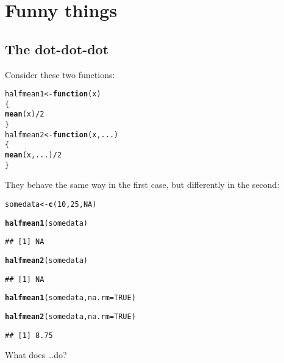 \documentclass[12pt,a4paper]{scrartcl}\usepackage[]{graphicx}\usepackage[]{color}
\makeatletter
\newcommand{\hlnum}[1]{\textcolor[rgb]{0.686,0.059,0.569}{#1}}%
\newcommand{\hlopt}[1]{\textcolor[rgb]{0,0,0}{#1}}%
\newcommand{\hlstd}[1]{\textcolor[rgb]{0.345,0.345,0.345}{#1}}%
\newcommand{\hlkwa}[1]{\textcolor[rgb]{0.161,0.373,0.58}{\textbf{#1}}}%
\newcommand{\hlkwb}[1]{\textcolor[rgb]{0.69,0.353,0.396}{#1}}%
\newcommand{\hlkwc}[1]{\textcolor[rgb]{0.333,0.667,0.333}{#1}}%
\newcommand{\hlkwd}[1]{\textcolor[rgb]{0.737,0.353,0.396}{\textbf{#1}}}%
\newenvironment{kframe}{%
 \def\at@end@of@kframe{}%
 \ifinner\ifhmode%
  \def\at@end@of@kframe{\end{minipage}}%
  \begin{minipage}{\columnwidth}%
 \fi\fi%
 \def\FrameCommand##1{\hskip\@totalleftmargin \hskip-\fboxsep
 \colorbox{shadecolor}{##1}\hskip-\fboxsep
     \hskip-\linewidth \hskip-\@totalleftmargin \hskip\columnwidth}%
 \MakeFramed {\advance\hsize-\width
   \@totalleftmargin\z@ \linewidth\hsize
   \@setminipage}}%
 {\par\unskip\endMakeFramed%
 \at@end@of@kframe}
\newenvironment{knitrout}{}{} %
\makeatother
\begin{document}
\section{Funny things}

\subsection{The dot-dot-dot}

\begin{Exercise}[difficulty=1, title={Understand the \texttt{\dots}}]
Consider these two functions:
\begin{knitrout}
\color{fgcolor}\begin{kframe}
\begin{alltt}
\hlstd{halfmean1} \hlkwb{<-} \hlkwa{function}\hlstd{(}\hlkwc{x}\hlstd{)}
\hlstd{\{}
  \hlkwd{mean}\hlstd{(x)}\hlopt{/}\hlnum{2}
\hlstd{\}}
\hlstd{halfmean2} \hlkwb{<-} \hlkwa{function}\hlstd{(}\hlkwc{x}\hlstd{,}\hlkwc{...}\hlstd{)}
\hlstd{\{}
  \hlkwd{mean}\hlstd{(x,...)}\hlopt{/}\hlnum{2}
\hlstd{\}}
\end{alltt}
\end{kframe}
\end{knitrout}

They behave the same way in the first case, but differently in the second:
\begin{knitrout}
\color{fgcolor}\begin{kframe}
\begin{alltt}
\hlstd{somedata} \hlkwb{<-} \hlkwd{c}\hlstd{(}\hlnum{10}\hlstd{,} \hlnum{25}\hlstd{,} \hlnum{NA}\hlstd{)}

\hlkwd{halfmean1}\hlstd{(somedata)}
\end{alltt}
\begin{verbatim}
## [1] NA
\end{verbatim}
\begin{alltt}
\hlkwd{halfmean2}\hlstd{(somedata)}
\end{alltt}
\begin{verbatim}
## [1] NA
\end{verbatim}
\begin{alltt}
\hlkwd{halfmean1}\hlstd{(somedata,} \hlkwc{na.rm}\hlstd{=}\hlnum{TRUE}\hlstd{)}
\end{alltt}


{\ttfamily\noindent\bfseries\color{errorcolor}{\#\# Error in halfmean1(somedata, na.rm = TRUE): unused argument (na.rm = TRUE)}}\begin{alltt}
\hlkwd{halfmean2}\hlstd{(somedata,} \hlkwc{na.rm}\hlstd{=}\hlnum{TRUE}\hlstd{)}
\end{alltt}
\begin{verbatim}
## [1] 8.75
\end{verbatim}
\end{kframe}
\end{knitrout}
What does \dots do?
\end{Exercise}
\end{document}
